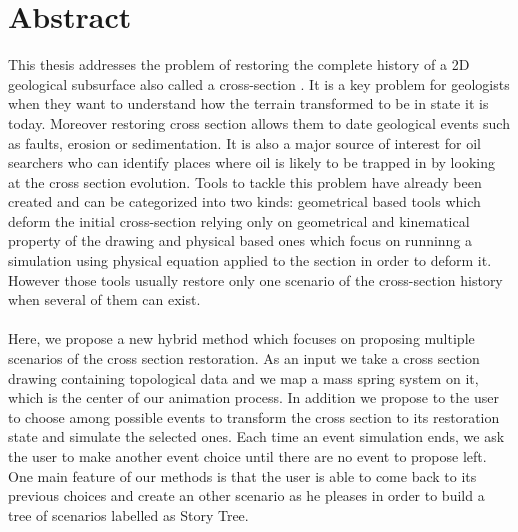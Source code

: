 \documentclass[12pt, a4paper]{report} %
\begin{document}

\tableofcontents

\chapter{Abstract}

This thesis addresses the problem of restoring the complete history of a 2D geological 
subsurface also called a cross-section \cite{BalancedCrossSections}. It is a key problem for geologists when they want to understand how the terrain transformed to be in state it is today. Moreover restoring cross section allows them to date geological events such as faults, erosion or sedimentation. It is also a major source of interest for oil searchers who can identify places where oil is likely to be trapped in by looking at the cross section evolution. Tools to tackle this problem have already been created and can  be categorized into two kinds: geometrical based tools which deform the initial cross-section relying only on geometrical and kinematical property of the drawing and physical based ones which focus on runninng a simulation using physical equation applied to the section in order to deform it. However those tools usually restore only one scenario of the cross-section history when several of them can exist.\\\\
 Here, we propose a new hybrid method which focuses on proposing multiple scenarios of the cross section restoration. As an input we take a cross section drawing containing topological data and we map a mass spring system on it, which is the center of our animation process. In addition we propose to the user to choose among possible events to transform the cross section to its restoration state and simulate the selected ones. Each time an event simulation ends, we ask the user to make another event choice until there are no event to propose left. One main feature of our methods is that the user is able to come back to its previous choices and create an other scenario as he pleases in order to build a tree of scenarios labelled as Story Tree.\\\\
\end{document}

